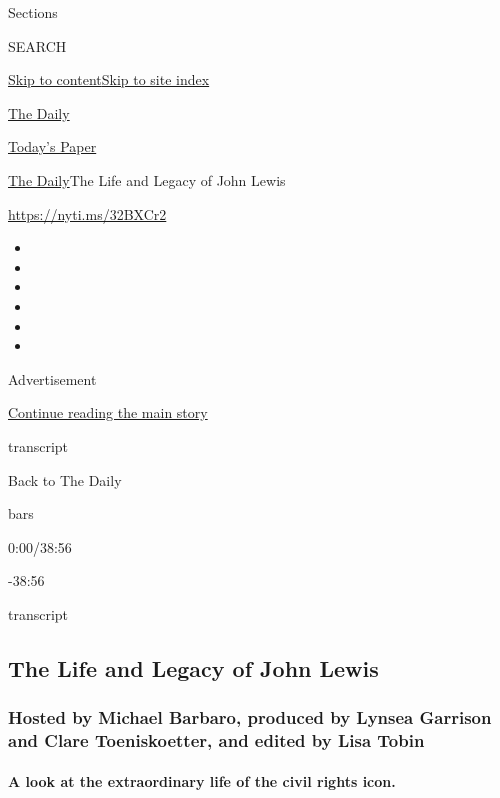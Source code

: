 Sections

SEARCH

\protect\hyperlink{site-content}{Skip to
content}\protect\hyperlink{site-index}{Skip to site index}

\href{https://www.nytimes3xbfgragh.onion/podcasts/the-daily}{The Daily}

\href{https://myaccount.nytimes3xbfgragh.onion/auth/login?response_type=cookie\&client_id=vi}{}

\href{https://www.nytimes3xbfgragh.onion/section/todayspaper}{Today's
Paper}

\href{/podcasts/the-daily}{The Daily}\textbar{}The Life and Legacy of
John Lewis

\url{https://nyti.ms/32BXCr2}

\begin{itemize}
\item
\item
\item
\item
\item
\item
\end{itemize}

Advertisement

\protect\hyperlink{after-top}{Continue reading the main story}

transcript

Back to The Daily

bars

0:00/38:56

-38:56

transcript

\hypertarget{the-life-and-legacy-of-john-lewis}{%
\subsection{The Life and Legacy of John
Lewis}\label{the-life-and-legacy-of-john-lewis}}

\hypertarget{hosted-by-michael-barbaro-produced-by-lynsea-garrison-and-clare-toeniskoetter-and-edited-by-lisa-tobin}{%
\subsubsection{Hosted by Michael Barbaro, produced by Lynsea Garrison
and Clare Toeniskoetter, and edited by Lisa
Tobin}\label{hosted-by-michael-barbaro-produced-by-lynsea-garrison-and-clare-toeniskoetter-and-edited-by-lisa-tobin}}

\hypertarget{a-look-at-the-extraordinary-life-of-the-civil-rights-icon}{%
\paragraph{A look at the extraordinary life of the civil rights
icon.}\label{a-look-at-the-extraordinary-life-of-the-civil-rights-icon}}

